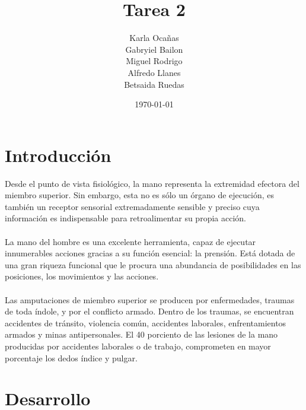 \documentclass{article}
\author{Karla Ocañas \\ Gabryiel Bailon \\ Miguel Rodrigo \\ Alfredo Llanes \\ Betsaida Ruedas} %
\title{Tarea 2} %
\date{\today}
\begin{document}

\maketitle %

\section{Introducci\'{o}n}\label{intro} %
Desde el punto de vista fisiológico, la mano representa la extremidad efectora del miembro superior. Sin embargo, esta no es sólo un órgano de ejecución, es también un receptor sensorial extremadamente sensible y preciso cuya información es indispensable para retroalimentar su propia acción.\\
\\
La mano del hombre es una excelente herramienta, capaz de ejecutar innumerables acciones gracias a su función esencial: la prensión. Está dotada de una gran riqueza funcional que le procura una abundancia de posibilidades en las posiciones, los movimientos y las acciones.\\
\\
Las amputaciones de miembro superior se producen por enfermedades, traumas de toda índole, y por el conflicto armado. Dentro de los traumas, se encuentran accidentes de tránsito, violencia común, accidentes laborales, enfrentamientos armados y minas antipersonales. El 40 porciento de las lesiones de la mano producidas por accidentes laborales o de trabajo, comprometen en mayor porcentaje los dedos índice y pulgar.



\section{Desarrollo}
\end{document}
